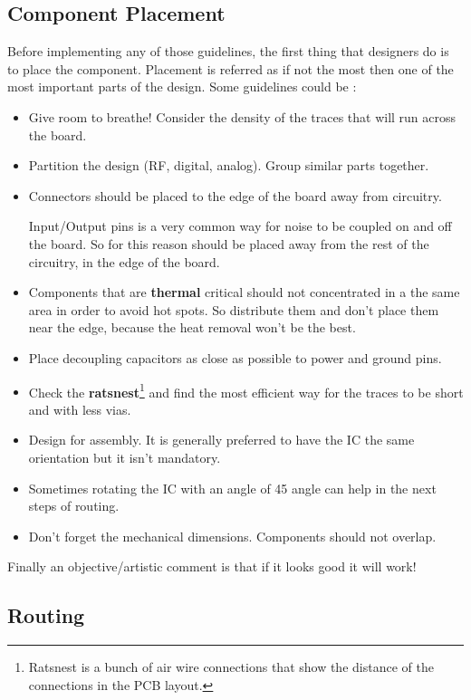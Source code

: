 \documentclass[final]{cubedoc}
\begin{document}
	\subsection{Component Placement}
	
	Before implementing any of those guidelines, the first thing that designers do is to place the component. Placement is referred as if not the most then one of the most important parts of the design. Some guidelines could be \cite{allcircuits:thermal, hubing2003pcb, ema2019hitchhiker, rangu2014getting}:
	
	\begin{itemize}
		\item Give room to breathe! Consider the density of the traces that will run across the board.
		\item Partition the design (RF, digital, analog). Group similar parts together.
		\item Connectors should be placed to the edge of the board away from circuitry.
		
		Input/Output pins is a very common way for noise to be coupled on and off the board. So for this reason should be placed away from the rest of the circuitry, in the edge of the board.
		
		\item Components that are \textbf{thermal} critical should not concentrated in a the same area in order to avoid hot spots. So distribute them and don't place them near the edge, because the heat removal won't be the best. 
		\item Place decoupling capacitors as close as possible to power and ground pins.
		\item Check the \textbf{ratsnest}\footnote{Ratsnest is a bunch of air wire connections that show the distance of the connections in the PCB layout.} and find the most efficient way for the traces to be short and with less vias.
		\item Design for assembly. It is generally preferred to have the IC the same orientation but it isn't mandatory.
		\item Sometimes rotating the IC with an angle of 45 angle can help in the next steps of routing.
		\item Don't forget the mechanical dimensions. Components should not overlap.
	\end{itemize}
	
	Finally an objective/artistic comment is that if it looks good it will work!
	
	\subsection{Routing}
	
\end{document}
